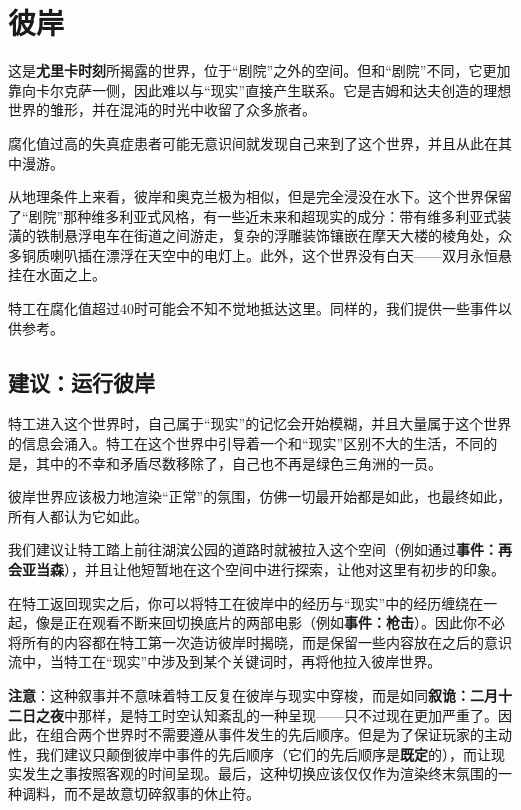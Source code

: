 \section{彼岸}

这是\textbf{尤里卡时刻}所揭露的世界，位于“剧院”之外的空间。但和“剧院”不同，它更加靠向卡尔克萨一侧，因此难以与“现实”直接产生联系。它是吉姆和达夫创造的理想世界的雏形，并在混沌的时光中收留了众多旅者。

腐化值过高的失真症患者可能无意识间就发现自己来到了这个世界，并且从此在其中漫游。

从地理条件上来看，彼岸和奥克兰极为相似，但是完全浸没在水下。这个世界保留了“剧院”那种维多利亚式风格，有一些近未来和超现实的成分：带有维多利亚式装潢的铁制悬浮电车在街道之间游走，复杂的浮雕装饰镶嵌在摩天大楼的棱角处，众多铜质喇叭插在漂浮在天空中的电灯上。此外，这个世界没有白天——双月永恒悬挂在水面之上。

特工在腐化值超过40时可能会不知不觉地抵达这里。同样的，我们提供一些事件以供参考。

\subsection{建议：运行彼岸}

特工进入这个世界时，自己属于“现实”的记忆会开始模糊，并且大量属于这个世界的信息会涌入。特工在这个世界中引导着一个和“现实”区别不大的生活，不同的是，其中的不幸和矛盾尽数移除了，自己也不再是绿色三角洲的一员。

彼岸世界应该极力地渲染“正常”的氛围，仿佛一切最开始都是如此，也最终如此，所有人都认为它如此。

我们建议让特工踏上前往湖滨公园的道路时就被拉入这个空间（例如通过\textbf{事件：再会亚当森}），并且让他短暂地在这个空间中进行探索，让他对这里有初步的印象。

在特工返回现实之后，你可以将特工在彼岸中的经历与“现实”中的经历缠绕在一起，像是正在观看不断来回切换底片的两部电影（例如\textbf{事件：枪击}）。因此你不必将所有的内容都在特工第一次造访彼岸时揭晓，而是保留一些内容放在之后的意识流中，当特工在“现实”中涉及到某个关键词时，再将他拉入彼岸世界。

\textbf{注意}：这种叙事并不意味着特工反复在彼岸与现实中穿梭，而是如同\textbf{叙诡：二月十二日之夜}中那样，是特工时空认知紊乱的一种呈现——只不过现在更加严重了。因此，在组合两个世界时不需要遵从事件发生的先后顺序。但是为了保证玩家的主动性，我们建议只颠倒彼岸中事件的先后顺序（它们的先后顺序是\textbf{既定}的），而让现实发生之事按照客观的时间呈现。最后，这种切换应该仅仅作为渲染终末氛围的一种调料，而不是故意切碎叙事的休止符。

